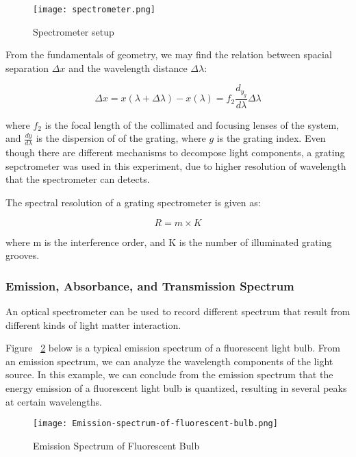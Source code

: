 \documentclass{article}
\begin{document}
\begin{figure}[h!]
    \centering
    \texttt{[image: spectrometer.png]}
    \caption{Spectrometer setup}
    \label{fig:spectrometer_setup}
\end{figure}


From the fundamentals of geometry, we may find the relation between spacial separation $\Delta x$ and the wavelength distance $\Delta \lambda$:

\begin{equation}
    \Delta x = x(\lambda + \Delta \lambda) - x(\lambda) = f_{2}\frac{d_{y_{g}}}{d\lambda} \Delta \lambda
\end{equation}

where $f_2$ is the focal length of the collimated and focusing lenses of the system, and $\frac{dy}{d \lambda}$ is the dispersion of of the grating, where $g$ is the grating index. Even though there are different mechanisms to decompose light components, a grating sepctrometer was used in this experiment, due to higher resolution of wavelength that the spectrometer can detects.

The spectral resolution of a grating spectrometer is given as:

\begin{equation}
    R = m \times K
\end{equation}

where m is the interference order, and K is the number of illuminated grating grooves.

\subsubsection{Emission, Absorbance, and Transmission Spectrum}

An optical spectrometer can be used to record different spectrum that result from different kinds of light matter interaction.

Figure ~\ref{fig:Fluorescent_Bulb} below is a typical emission spectrum of a fluorescent light bulb. From an emission spectrum, we can analyze the wavelength components of the light source. In this example, we can conclude from the emission spectrum that the energy emission of a fluorescent light bulb is quantized, resulting in several peaks at certain wavelengths.     

\begin{figure}
    \centering
    \texttt{[image: Emission-spectrum-of-fluorescent-bulb.png]}
    \caption{Emission Spectrum of Fluorescent Bulb}
    \label{fig:Fluorescent_Bulb}
\end{figure}
\end{document}

